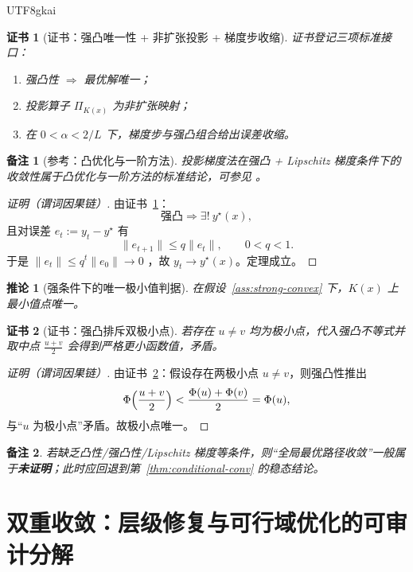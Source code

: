 \documentclass[12pt]{article}
\newtheorem{corollary}{推论}[section]
\newtheorem{remark}{备注}[section]
\newtheorem{Certificate}{证书}[section]
\begin{document}
\begin{CJK*}{UTF8}{gkai}
\begin{Certificate}[证书：强凸唯一性 + 非扩张投影 + 梯度步收缩]\label{cert:pgd-global}
证书登记三项标准接口：
\begin{enumerate}
\item 强凸性 $\Rightarrow$ 最优解唯一；
\item 投影算子 $\Pi_{K(x)}$ 为非扩张映射；
\item 在 $0<\alpha<2/L$ 下，梯度步与强凸组合给出误差收缩。
\end{enumerate}
\end{Certificate}

\begin{remark}[参考：凸优化与一阶方法]
投影梯度法在强凸 + Lipschitz 梯度条件下的收敛性属于凸优化与一阶方法的标准结论，可参见 \cite{BoydVandenberghe2004,Nesterov2004,Beck2017,BauschkeCombettes2017}
  。
\end{remark}

\begin{proof}[证明（谓词因果链）]
由证书~\ref{cert:pgd-global}：
\[
\text{强凸}
\Rightarrow
\exists!\ y^\star(x),
\]
且对误差 $e_t:=y_t-y^\star$ 有
\[
\|e_{t+1}\|
\le
q\|e_t\|,\qquad 0<q<1.
\]
于是
\(
\|e_t\|\le q^t\|e_0\|\to0
\)
，故 $y_t\to y^\star(x)$。定理成立。
\end{proof}

\begin{corollary}[强条件下的唯一极小值判据]\label{cor:unique-minimizer}
在假设~\ref{ass:strong-convex} 下，$K(x)$ 上最小值点唯一。
\end{corollary}

\begin{Certificate}[证书：强凸排斥双极小点]\label{cert:unique-minimizer}
若存在 $u\neq v$ 均为极小点，代入强凸不等式并取中点
\(
\tfrac{u+v}{2}
\)
会得到严格更小函数值，矛盾。
\end{Certificate}

\begin{proof}[证明（谓词因果链）]
由证书~\ref{cert:unique-minimizer}：假设存在两极小点 $u\neq v$，则强凸性推出
\[
\Phi\Bigl(\frac{u+v}{2}\Bigr)
<
\frac{\Phi(u)+\Phi(v)}{2}
=
\Phi(u),
\]
与“$u$ 为极小点”矛盾。故极小点唯一。
\end{proof}

\begin{remark}
若缺乏凸性/强凸性/Lipschitz 梯度等条件，则“全局最优路径收敛”一般属于\textbf{未证明}；此时应回退到第~\ref{thm:conditional-conv} 的稳态结论。
\end{remark}

\section{双重收敛：层级修复与可行域优化的可审计分解}
\label{sec:double-convergence}


\end{CJK*}
\end{document}
